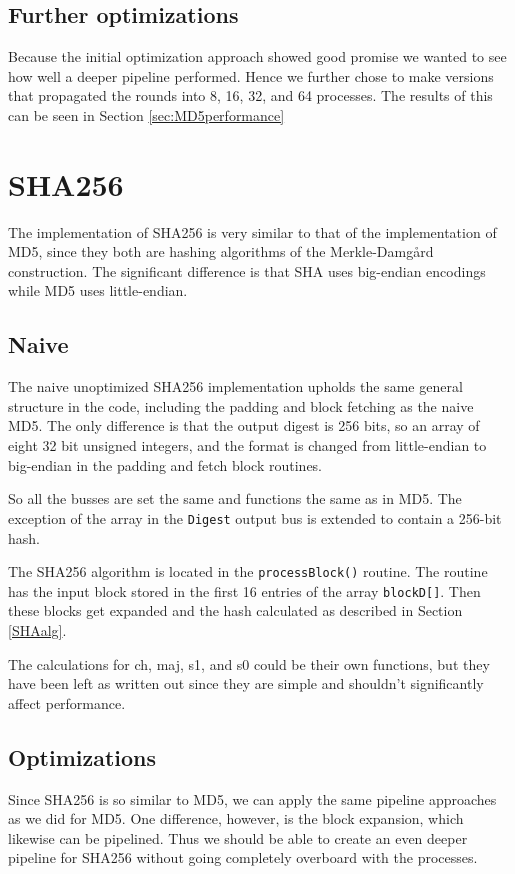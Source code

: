 \documentclass[a4paper, openany]{book}
\begin{document}
\subsection{Further optimizations}
\label{sec:org5c27002}
Because the initial optimization approach showed good promise we wanted to see how well a deeper pipeline performed. Hence we further chose to make versions that propagated the rounds into 8, 16, 32, and 64 processes. The results of this can be seen in Section \ref{sec:MD5performance}
\section{SHA256}
\label{sec:orga6c9567}
The implementation of SHA256 is very similar to that of the implementation of MD5,
since they both are hashing algorithms of the Merkle-Damgård construction.
The significant difference is that SHA uses big-endian encodings while MD5 uses little-endian.

\subsection{Naive}
\label{SHAnaive}
The naive unoptimized SHA256 implementation upholds the same general structure in the code, including the padding and block fetching as the naive MD5.
The only difference is that the output digest is 256 bits, so an array of eight 32 bit unsigned integers,
and the format is changed from little-endian to big-endian in the padding and fetch block routines.

So all the busses are set the same and functions the same as in MD5. The exception of the array in the \texttt{Digest} output bus is extended to contain a 256-bit hash.

The SHA256 algorithm is located in the \texttt{processBlock()} routine.
The routine has the input block stored in the first 16 entries of the array \texttt{blockD[]}.
Then these blocks get expanded and the hash calculated as described in Section \ref{SHAalg}.

The calculations for ch, maj, s1, and s0 could be their own functions, but they have been left as written out since they are simple and shouldn't significantly affect performance.
\subsection{Optimizations}
\label{sec:org0e8da32}
Since SHA256 is so similar to MD5, we can apply the same pipeline approaches as we did for MD5. One difference, however, is the block expansion, which likewise can be pipelined. Thus we should be able to create an even deeper pipeline for SHA256 without going completely overboard with the processes.
\end{document}
